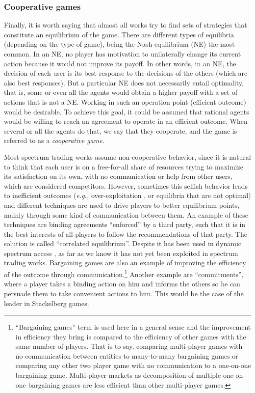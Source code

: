 \subsubsection{Cooperative games}
Finally, it is worth saying that almost all works try to find sets of strategies that constitute an equilibrium of the game.
There are different types of equilibria (depending on the type of game), being the Nash equilibrium (NE) the most common. 
In an NE, no player has motivation to unilaterally change its current action because it would not improve its payoff. 
In other words, in an NE, the decision of each user is its best response to the decisions of the others (which are also best responses). 
But a particular NE does not necessarily entail optimality, that is, some or even all the agents would obtain a higher payoff with a set of actions that is not a NE.
Working in such an operation point (efficient outcome) would be desirable. 
To achieve this goal, it could be assumed that rational agents would be willing to reach an agreement to operate in an efficient outcome. 
When several or all the agents do that, we say that they cooperate, and the game is referred to as a \textit{cooperative game}.

Most spectrum trading works assume non-cooperative behavior, since it is natural to think that each user is on a free-for-all share of resources trying to maximize its satisfaction on its own, with no communication or help from other users, which are considered competitors.
However, sometimes this selfish behavior leads to inefficient outcomes (\textit{e.g.,} over-exploitation \cite{ref:Hardin1968}, or equilibria that are not optimal) and different techniques are used to drive players to better equilibrium points, mainly through some kind of communication between them. 
An example of these techniques are binding agreements ``enforced'' by a third party, such that it is in the best interests of all players to follow the recommendations of that party. 
The solution is called ``correlated equilibrium''. 
Despite it has been used in dynamic spectrum access \cite{ref:Han2007,ref:Maskery2009}, as far as we know it has not yet been exploited in spectrum trading works. 
Bargaining games are also an example of improving the efficiency of the outcome through communication.\footnote{``Bargaining games'' term is used here in a general sense and the improvement in efficiency they bring is compared to the efficiency of other games with the same number of players. That is to say, comparing multi-player games with no communication between entities to many-to-many bargaining games or comparing any other two player game with no communication to a one-on-one bargaining game. Multi-player markets as decomposition of multiple one-on-one bargaining games are less efficient than other multi-player games.} 
Another example are ``commitments'', where a player takes a binding action on him and informs the others so he can persuade them to take convenient actions to him. This would be the case of the leader in Stackelberg games. 

